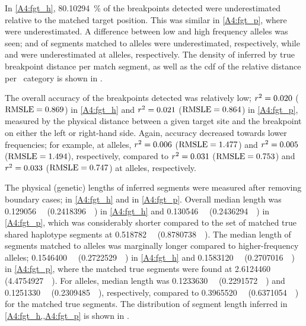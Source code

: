 %

%


In \cref{A4:fgt_h}, \SI{80.10294}{\percent} of the breakpoints detected were underestimated relative to the matched target position.
This was similar in \cref{A4:fgt_p}, where  were underestimated.
A difference between low and high frequency alleles was seen;  and  of segments matched to  alleles were underestimated, respectively, while  and  were underestimated at  alleles, respectively.
The density of inferred by true breakpoint distance per match segment, as well as the \gls{cdf} of the relative distance per \fk{}~category is shown in .

The overall accuracy of the breakpoints detected was relatively low;
${r^2=\dec{0.02002049}}$ ($\rmsle=\dec{0.8689641}$) in \ref{A4:fgt_h} and
${r^2=\dec{0.02134879}}$ ($\rmsle=\dec{0.8640695}$) in \ref{A4:fgt_p}, measured by the physical distance between a given target site and the breakpoint on either the left or right-hand side.
Again, accuracy decreased towards lower frequencies; for example, at  alleles,
${r^2=\dec{0.005844105}}$ (${\rmsle=\dec{1.4768689}}$) and
${r^2=\dec{0.005439204}}$ (${\rmsle=\dec{1.4941836}}$), respectively, compared to
${r^2=\dec{0.030571264}}$ (${\rmsle=\dec{0.7530622}}$) and
${r^2=\dec{0.032509924}}$ (${\rmsle=\dec{0.7466905}}$) at  alleles, respectively.


%

%


The physical (genetic) lengths of inferred segments were measured after removing boundary cases;
 in \ref{A4:fgt_h} and
 in \ref{A4:fgt_p}.
Overall median length was
\SI{0.129056}{\mega\basepair} (\SI{0.2418396}{\centi\morgan}) in \ref{A4:fgt_h} and
\SI{0.130546}{\mega\basepair} (\SI{0.2436294}{\centi\morgan}) in \ref{A4:fgt_p}, which was considerably shorter compared to the set of matched true shared haplotype segments at
\SI{0.518782}{\mega\basepair} (\SI{0.8780738}{\centi\morgan}).
The median length of segments matched to  alleles was marginally longer compared to higher-frequency alleles;
\SI{0.1546400}{\mega\basepair} (\SI{0.2722529}{\centi\morgan}) in \ref{A4:fgt_h} and
\SI{0.1583120}{\mega\basepair} (\SI{0.2707016}{\centi\morgan}) in \ref{A4:fgt_p}, where the matched true segments were found at
\SI{2.6124460}{\mega\basepair} (\SI{4.4754927}{\centi\morgan}).
For  alleles, median length was
\SI{0.1233630}{\mega\basepair} (\SI{0.2291572}{\centi\morgan}) and
\SI{0.1251330}{\mega\basepair} (\SI{0.2309485}{\centi\morgan}), respectively, compared to
\SI{0.3965520}{\mega\basepair} (\SI{0.6371054}{\centi\morgan}) for the matched true segments.
The distribution of segment length inferred in \cref{A4:fgt_h,,A4:fgt_p} is shown in .



